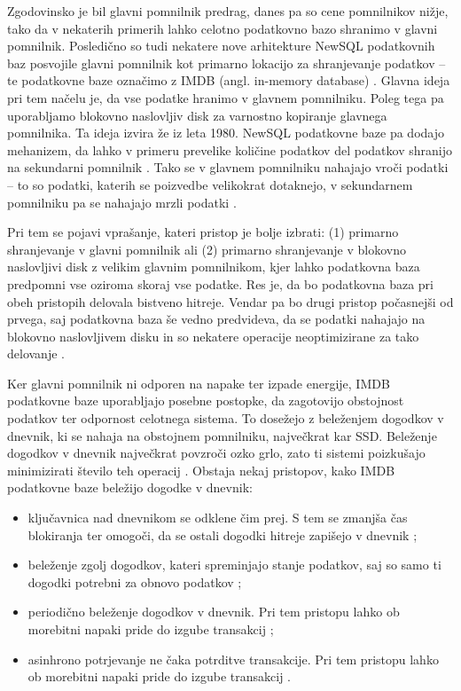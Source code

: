 \documentclass[a4paper, 12pt]{book}
\begin{document}
Zgodovinsko je bil glavni pomnilnik predrag, danes pa so cene pomnilnikov nižje, tako da v nekaterih primerih lahko celotno podatkovno bazo shranimo v glavni pomnilnik. Posledično so tudi nekatere nove arhitekture NewSQL podatkovnih baz posvojile glavni pomnilnik kot primarno lokacijo za shranjevanje podatkov -- te podatkovne baze označimo z IMDB (angl. in-memory database) \cite{NewSqlInMemoryAnalytics}. Glavna ideja pri tem načelu je, da vse podatke hranimo v glavnem pomnilniku. Poleg tega pa uporabljamo blokovno naslovljiv disk za varnostno kopiranje glavnega pomnilnika. Ta ideja izvira že iz leta 1980.
NewSQL podatkovne baze pa dodajo mehanizem, da lahko v primeru prevelike količine podatkov del podatkov shranijo na sekundarni pomnilnik \cite{Pavlo2016Sep}. Tako se v glavnem pomnilniku nahajajo vroči podatki -- to so podatki, katerih se po\-iz\-ved\-be velikokrat dotaknejo, v sekundarnem pomnilniku pa se nahajajo mrzli podatki \cite{NewSqlInMemoryAnalytics}.

Pri tem se pojavi vprašanje, kateri pristop je bolje izbrati: (1) primarno shranjevanje v glavni pomnilnik ali (2) primarno shranjevanje v blokovno naslovljivi disk z velikim glavnim pomnilnikom, kjer lahko podatkovna baza predpomni vse oziroma skoraj vse podatke. Res je, da bo podatkovna baza pri obeh pristopih delovala bistveno hitreje. Vendar pa bo drugi pristop počasnejši od prvega, saj podatkovna baza še vedno predvideva, da se podatki nahajajo na blokovno naslovljivem disku in so nekatere operacije neoptimizirane za tako delovanje \cite{garcia1992main}.

Ker glavni pomnilnik ni odporen na napake ter izpade energije, IMDB podatkovne baze uporabljajo posebne postopke, da zagotovijo obstojnost podatkov ter odpornost celotnega sistema. To dosežejo z beleženjem dogodkov v dnevnik, ki se nahaja na obstojnem pomnilniku, največkrat kar SSD. Beleženje dogodkov v dnevnik največkrat povzroči ozko grlo, zato ti sistemi poizkušajo minimizirati število teh operacij \cite{MainMemoryDatabaseSystems}. Obstaja nekaj pristopov, kako IMDB podatkovne baze beležijo dogodke v dnevnik:

\begin{itemize}
    \item ključavnica nad dnevnikom se odklene čim prej. S tem se zmanjša čas blokiranja ter omogoči, da se ostali dogodki hitreje zapišejo v dnevnik \cite{NewSqlInMemoryAnalytics};
    \item beleženje zgolj dogodkov, kateri spreminjajo stanje podatkov, saj so samo ti dogodki potrebni za obnovo podatkov \cite{MainMemoryDatabaseSystems};
    \item periodično beleženje dogodkov v dnevnik. Pri tem pristopu lahko ob morebitni napaki pride do izgube transakcij \cite{NewSqlInMemoryAnalytics};
    \item asinhrono potrjevanje ne čaka potrditve transakcije. Pri tem pristopu lahko ob morebitni napaki pride do izgube transakcij \cite{NewSqlInMemoryAnalytics}. 
\end{itemize}
\end{document}
